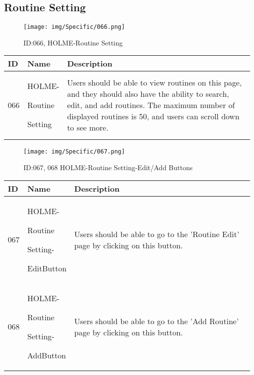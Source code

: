 \documentclass[conference]{IEEEtran}
\begin{document}
\begin{enumerate}
\subsection{Routine Setting}
\begin{figure}[h]
\centering
\texttt{[image: img/Specific/066.png]}
\caption{ID:066, HOLME-Routine Setting}
\end{figure}
\begin{table}[h]
\def\arraystretch{1.2} \small
    \begin{tabular}{|p{1cm}|p{1.8cm}|p{5.0cm}|}
        \hline
        ID & Name & Description\\ \hline
         066 \par  & HOLME-\par Routine \par Setting  & 

Users should be able to view routines on this page, and they should also have the ability to search, edit, and add routines. The maximum number of displayed routines is 50, and users can scroll down to see more. \\ \hline
    \end{tabular}
\end{table}

\begin{figure}[h]
\centering
\texttt{[image: img/Specific/067.png]}
\caption{ID:067, 068 HOLME-Routine Setting-Edit/Add Buttons}
\end{figure}
\begin{table}[h]
\def\arraystretch{1.2} \small
    \begin{tabular}{|p{1cm}|p{1.8cm}|p{5.0cm}|}
        \hline
        ID & Name & Description\\ \hline
         067 \par  & HOLME-\par Routine \par Setting- \par EditButton & 
Users should be able to go to the 'Routine Edit' page by clicking on this button.\\ \hline
         068 \par  & HOLME-\par Routine \par Setting- \par AddButton & 

Users should be able to go to the 'Add Routine' page by clicking on this button. \\ \hline    
    \end{tabular}
\end{table}


\end{enumerate}
\end{document}
